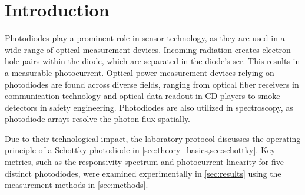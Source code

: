 \section{Introduction}\label{sec:introduction}

Photodiodes play a prominent role in sensor technology, as they are used in a
wide range of optical measurement devices. Incoming radiation creates electron-hole
pairs within the diode, which are separated in the diode's \ac{scr}. This
results in a measurable photocurrent. Optical power measurement devices relying on
photodiodes are found across diverse fields, ranging from optical fiber
receivers in communication technology and optical data readout in CD players to
smoke detectors in safety engineering. Photodiodes are also utilized in spectroscopy,
as photodiode arrays resolve the photon flux spatially.

Due to their technological impact, the laboratory protocol discusses the operating
principle of a Schottky photodiode in \cref{sec:theory_basics,sec:schottky}. Key
metrics, such as the responsivity spectrum and photocurrent linearity for five distinct
photodiodes, were examined experimentally in \cref{sec:results} using the measurement
methods in \cref{sec:methods}.